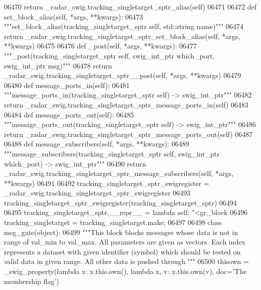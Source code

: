 \begin{DoxyCode}
{{{{{{{{{{{{{{{{{{{{{06470         \textcolor{keywordflow}{return} \_radar\_swig.tracking\_singletarget\_sptr\_alias(self)
06471 
06472     \textcolor{keyword}{def }set_block_alias(self, *args, **kwargs):
06473         \textcolor{stringliteral}{"""set\_block\_alias(tracking\_singletarget\_sptr self, std::string name)"""}
06474         \textcolor{keywordflow}{return} \_radar\_swig.tracking\_singletarget\_sptr\_set\_block\_alias(self, *args, **kwargs)
06475 
06476     \textcolor{keyword}{def }_post(self, *args, **kwargs):
06477         \textcolor{stringliteral}{"""\_post(tracking\_singletarget\_sptr self, swig\_int\_ptr which\_port, swig\_int\_ptr msg)"""}
06478         \textcolor{keywordflow}{return} \_radar\_swig.tracking\_singletarget\_sptr\_\_post(self, *args, **kwargs)
06479 
06480     \textcolor{keyword}{def }message_ports_in(self):
06481         \textcolor{stringliteral}{"""message\_ports\_in(tracking\_singletarget\_sptr self) -> swig\_int\_ptr"""}
06482         \textcolor{keywordflow}{return} \_radar\_swig.tracking\_singletarget\_sptr\_message\_ports\_in(self)
06483 
06484     \textcolor{keyword}{def }message_ports_out(self):
06485         \textcolor{stringliteral}{"""message\_ports\_out(tracking\_singletarget\_sptr self) -> swig\_int\_ptr"""}
06486         \textcolor{keywordflow}{return} \_radar\_swig.tracking\_singletarget\_sptr\_message\_ports\_out(self)
06487 
06488     \textcolor{keyword}{def }message_subscribers(self, *args, **kwargs):
06489         \textcolor{stringliteral}{"""message\_subscribers(tracking\_singletarget\_sptr self, swig\_int\_ptr which\_port) -> swig\_int\_ptr"""}
06490         \textcolor{keywordflow}{return} \_radar\_swig.tracking\_singletarget\_sptr\_message\_subscribers(self, *args, **kwargs)
06491 
06492 tracking\_singletarget\_sptr\_swigregister = \_radar\_swig.tracking\_singletarget\_sptr\_swigregister
06493 tracking_singletarget_sptr_swigregister(tracking\_singletarget\_sptr)
06494 
06495 tracking\_singletarget\_sptr.\_\_repr\_\_ = \textcolor{keyword}{lambda} self: \textcolor{stringliteral}{"<gr\_block %
06496 tracking\_singletarget = tracking\_singletarget.make;
06497 
06498 \textcolor{keyword}{class }msg_gate(object):
06499     \textcolor{stringliteral}{"""This block blocks messages whose data is not in range of val\_min to val\_max. All parameters are
       given as vectors. Each index represents a dataset with given identifier (symbol) which should be tested on valid
       data in given range. All other data is pushed through."""}
06500     thisown = _swig_property(\textcolor{keyword}{lambda} x: x.this.own(), \textcolor{keyword}{lambda} x, v: x.this.own(v), doc=\textcolor{stringliteral}{'The membership flag'})
}}}}}}}}}}}}}}}}}}}}}}
\end{DoxyCode}
